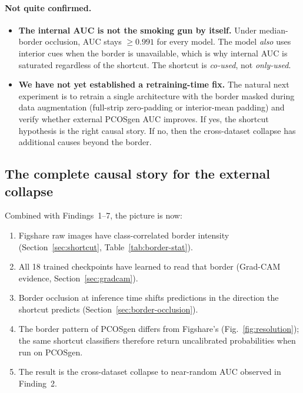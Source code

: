 \documentclass[11pt]{article}
\begin{document}
\paragraph{Not quite confirmed.}
\begin{itemize}
  \item \textbf{The internal AUC is not the smoking gun by itself.}
        Under median-border occlusion, AUC stays $\geq 0.991$ for
        every model. The model \emph{also} uses interior cues when the
        border is unavailable, which is why internal AUC is saturated
        regardless of the shortcut. The shortcut is \emph{co-used},
        not \emph{only-used}.
  \item \textbf{We have not yet established a retraining-time
        fix.} The natural next experiment is to retrain a single
        architecture with the border masked during data augmentation
        (full-strip zero-padding or interior-mean padding) and verify
        whether external PCOSgen AUC improves. If yes, the shortcut
        hypothesis is the right causal story. If no, then the
        cross-dataset collapse has additional causes beyond the
        border.
\end{itemize}

\subsection{The complete causal story for the external collapse}

Combined with Findings~1--7, the picture is now:

\begin{enumerate}
  \item Figshare raw images have class-correlated border intensity
        (Section~\ref{sec:shortcut}, Table~\ref{tab:border-stat}).
  \item All 18 trained checkpoints have learned to read that border
        (Grad-CAM evidence, Section~\ref{sec:gradcam}).
  \item Border occlusion at inference time shifts predictions in the
        direction the shortcut predicts
        (Section~\ref{sec:border-occlusion}).
  \item The border pattern of PCOSgen differs from Figshare's
        (Fig.~\ref{fig:resolution}); the same shortcut classifiers
        therefore return uncalibrated probabilities when run on
        PCOSgen.
  \item The result is the cross-dataset collapse to near-random AUC
        observed in Finding~2.
\end{enumerate}
\end{document}
